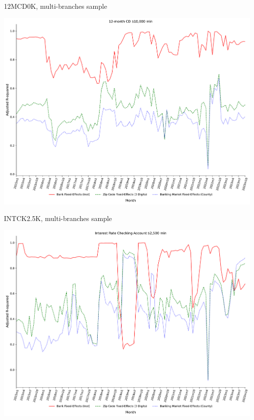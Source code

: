 \documentclass{beamer}
\begin{document}
\begin{frame}{12MCD0K, multi-branches sample}
\begin{center}
\includegraphics[width=1\textwidth]{figure/multi_branch_sample_932466/3_fixed_effects_same_as_GP_wp/12MCD10K_adjusted_R2_Rate_3_fixed_effects.pdf} 
\end{center}
\end{frame}

\begin{frame}{INTCK2.5K, multi-branches sample}
\begin{center}
\includegraphics[width=1\textwidth]{figure/multi_branch_sample_932466/3_fixed_effects_same_as_GP_wp/INTCK2_5K_adjusted_R2_Rate_3_fixed_effects.pdf} 
\end{center}
\end{frame}
\end{document}
